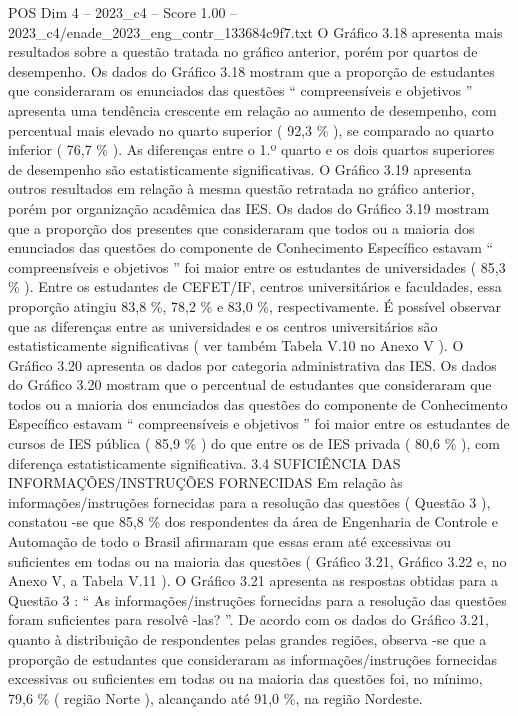 \begin{textsample}{POS Dim 4 – 2023\_c4 – Score 1.00 – 2023\_c4/enade\_2023\_eng\_contr\_133684c9f7.txt}
O Gráfico 3.18 apresenta mais resultados sobre a questão tratada no gráfico anterior, porém por quartos de desempenho.
Os dados do Gráfico 3.18 mostram que a proporção de estudantes que consideraram os enunciados das questões “ compreensíveis e objetivos ” apresenta uma tendência crescente em relação ao aumento de desempenho, com percentual mais elevado no quarto superior ( 92,3 \% ), se comparado ao quarto inferior ( 76,7 \% ).
As diferenças entre o 1.º quarto e os dois quartos superiores de desempenho são estatisticamente significativas.
O Gráfico 3.19 apresenta outros resultados em relação à mesma questão retratada no gráfico anterior, porém por organização acadêmica das IES.
Os dados do Gráfico 3.19 mostram que a proporção dos presentes que consideraram que todos ou a maioria dos enunciados das questões do componente de Conhecimento Específico estavam “ compreensíveis e objetivos ” foi maior entre os estudantes de universidades ( 85,3 \% ).
Entre os estudantes de CEFET/IF, centros universitários e faculdades, essa proporção atingiu 83,8 \%, 78,2 \% e 83,0 \%, respectivamente.
É possível observar que as diferenças entre as universidades e os centros universitários são estatisticamente significativas ( ver também Tabela V.10 no Anexo V ).
O Gráfico 3.20 apresenta os dados por categoria administrativa das IES.
Os dados do Gráfico 3.20 mostram que o percentual de estudantes que consideraram que todos ou a maioria dos enunciados das questões do componente de Conhecimento Específico estavam “ compreensíveis e objetivos ” foi maior entre os estudantes de cursos de IES pública ( 85,9 \% ) do que entre os de IES privada ( 80,6 \% ), com diferença estatisticamente significativa. 3.4 SUFICIÊNCIA DAS INFORMAÇÕES/INSTRUÇÕES FORNECIDAS Em relação às informações/instruções fornecidas para a resolução das questões ( Questão 3 ), constatou -se que 85,8 \% dos respondentes da área de Engenharia de Controle e Automação de todo o Brasil afirmaram que essas eram até excessivas ou suficientes em todas ou na maioria das questões ( Gráfico 3.21, Gráfico 3.22 e, no Anexo V, a Tabela V.11 ).
O Gráfico 3.21 apresenta as respostas obtidas para a Questão 3 : “ As informações/instruções fornecidas para a resolução das questões foram suficientes para resolvê -las? ”.
De acordo com os dados do Gráfico 3.21, quanto à distribuição de respondentes pelas grandes regiões, observa -se que a proporção de estudantes que consideraram as informações/instruções fornecidas excessivas ou suficientes em todas ou na maioria das questões foi, no mínimo, 79,6 \% ( região Norte ), alcançando até 91,0 \%, na região Nordeste.

\end{textsample}
